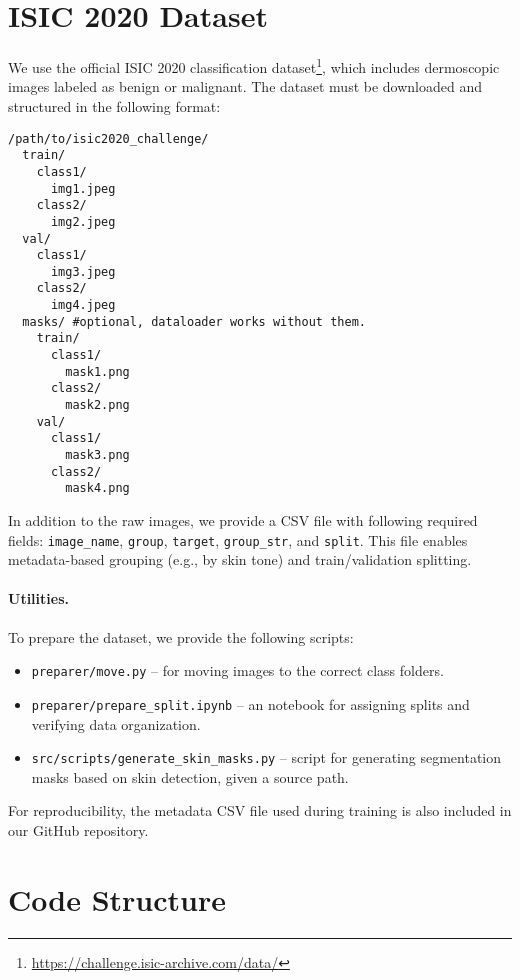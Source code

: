 \section{ISIC 2020 Dataset}

We use the official ISIC 2020 classification dataset\footnote{\url{https://challenge.isic-archive.com/data/}}, which includes dermoscopic images labeled as benign or malignant. The dataset must be downloaded and structured in the following format:

\begin{verbatim}
/path/to/isic2020_challenge/
  train/
    class1/
      img1.jpeg
    class2/
      img2.jpeg
  val/
    class1/
      img3.jpeg
    class2/
      img4.jpeg
  masks/ #optional, dataloader works without them.
    train/
      class1/
        mask1.png
      class2/
        mask2.png
    val/
      class1/
        mask3.png
      class2/
        mask4.png
\end{verbatim}

In addition to the raw images, we provide a CSV file with following required fields: \texttt{image\_name}, \texttt{group}, \texttt{target}, \texttt{group\_str}, and \texttt{split}. This file enables metadata-based grouping (e.g., by skin tone) and train/validation splitting.

\paragraph{Utilities.}  
To prepare the dataset, we provide the following scripts:

\begin{itemize}
    \item \texttt{preparer/move.py} – for moving images to the correct class folders.
    \item \texttt{preparer/prepare\_split.ipynb} – an  notebook for assigning splits and verifying data organization.
    \item \texttt{src/scripts/generate\_skin\_masks.py} – script for generating segmentation masks based on skin detection, given a source path.
\end{itemize}

For reproducibility, the metadata CSV file used during training is also included in our GitHub repository.

\section{Code Structure}

